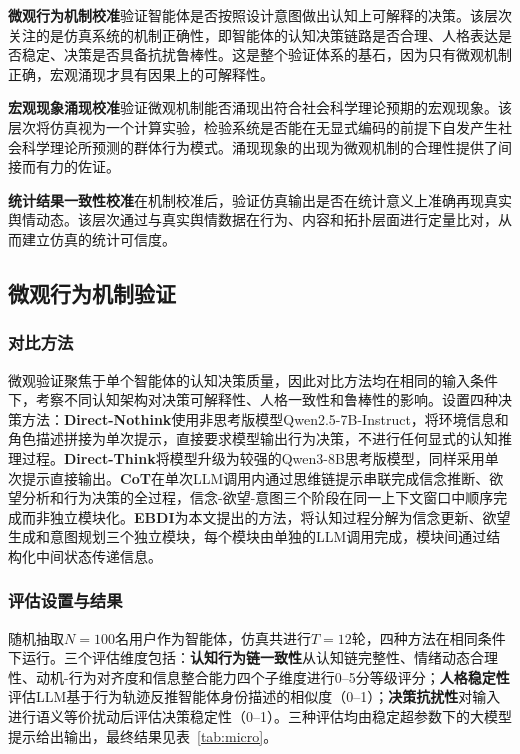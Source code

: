 \documentclass[a4paper,fleqn]{cas-sc}
\begin{document}
\textbf{微观行为机制校准}验证智能体是否按照设计意图做出认知上可解释的决策。该层次关注的是仿真系统的机制正确性，即智能体的认知决策链路是否合理、人格表达是否稳定、决策是否具备抗扰鲁棒性。这是整个验证体系的基石，因为只有微观机制正确，宏观涌现才具有因果上的可解释性。

\textbf{宏观现象涌现校准}验证微观机制能否涌现出符合社会科学理论预期的宏观现象。该层次将仿真视为一个计算实验，检验系统是否能在无显式编码的前提下自发产生社会科学理论所预测的群体行为模式。涌现现象的出现为微观机制的合理性提供了间接而有力的佐证。

\textbf{统计结果一致性校准}在机制校准后，验证仿真输出是否在统计意义上准确再现真实舆情动态。该层次通过与真实舆情数据在行为、内容和拓扑层面进行定量比对，从而建立仿真的统计可信度。

\subsection{微观行为机制验证}


\subsubsection{对比方法}

微观验证聚焦于单个智能体的认知决策质量，因此对比方法均在相同的输入条件下，考察不同认知架构对决策可解释性、人格一致性和鲁棒性的影响。设置四种决策方法：\textbf{Direct-Nothink}使用非思考版模型Qwen2.5-7B-Instruct，将环境信息和角色描述拼接为单次提示，直接要求模型输出行为决策，不进行任何显式的认知推理过程。\textbf{Direct-Think}将模型升级为较强的Qwen3-8B思考版模型，同样采用单次提示直接输出。\textbf{CoT}在单次LLM调用内通过思维链提示串联完成信念推断、欲望分析和行为决策的全过程，信念-欲望-意图三个阶段在同一上下文窗口中顺序完成而非独立模块化。\textbf{EBDI}为本文提出的方法，将认知过程分解为信念更新、欲望生成和意图规划三个独立模块，每个模块由单独的LLM调用完成，模块间通过结构化中间状态传递信息。

\subsubsection{评估设置与结果}

随机抽取$N=100$名用户作为智能体，仿真共进行$T=12$轮，四种方法在相同条件下运行。三个评估维度包括：\textbf{认知行为链一致性}从认知链完整性、情绪动态合理性、动机-行为对齐度和信息整合能力四个子维度进行0--5分等级评分；\textbf{人格稳定性}评估LLM基于行为轨迹反推智能体身份描述的相似度（0--1）；\textbf{决策抗扰性}对输入进行语义等价扰动后评估决策稳定性（0--1）。三种评估均由稳定超参数下的大模型提示给出输出，最终结果见表~\ref{tab:micro}。
\end{document}
